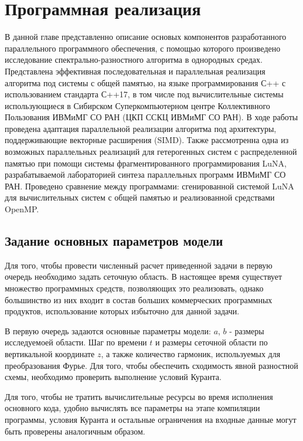 \section{Программная реализация}

В данной главе представленно описание основых компонентов разработанного параллельного программного обеспечения, 
с помощью которого произведено исследование спектрально-разностного алгоритма в однородных средах.
Представлена эффективная последовательная и параллельная реализация алгоритма под системы с общей памятью,
на языке программирования С++ с использованием стандарта С++17, в том числе под вычислительные системы использующиеся в Сибирском Суперкомпьютерном 
центре Коллективного Пользования ИВМиМГ СО РАН (ЦКП ССКЦ ИВМиМГ СО РАН). В ходе работы проведена  адаптация параллельной реализации алгоритма под архитектуры, поддерживающие векторные расширения (SIMD).
Также рассмотренна одна из возможных параллельных реализаций для гетерогенных систем с распределенной памятью
при помощи системы фрагментированного программирования LuNA, разрабатываемой лабораторией синтеза параллельных программ ИВМиМГ СО РАН.
Проведено сравнение между программами: сгенированной системой LuNA для вычислительных систем с общей памятью и реализованной средствами OpenMP.

\subsection{Задание основных параметров модели}

Для того, чтобы провести численный расчет приведенной задачи в первую очередь необходимо задать сеточную область.
В настоящее время существует множество программных средств, позволяющих это реализовать,
однако большинство из них входит в состав больших коммерческих программных продуктов, 
использование которых избыточно для данной задачи.

В первую очередь задаются основные параметры модели: $a$, $b$ - размеры исследуемоей области.
Шаг по времени $t$ и размеры сеточной области по вертикальной координате $z$, 
а также количество гармоник, используемых для преобразования Фурье. Для того, чтобы обеспечить
сходимость явной разностной схемы, необходимо проверить выполнение условий Куранта.

Для того, чтобы не тратить вычислительные ресурсы во время исполнения основного кода, 
удобно вычислять все параметры на этапе компиляции программы, условия Куранта и остальные ограничения на входные данные
могут быть проверены аналогичным образом.

